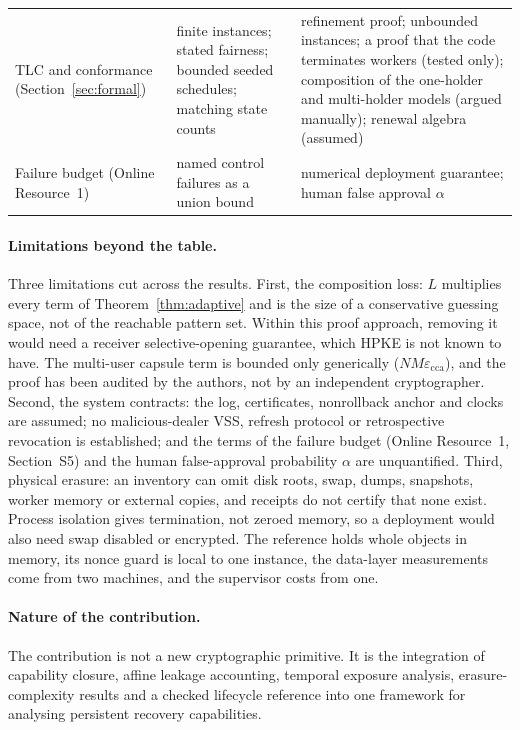 \documentclass[pdflatex,sn-mathphys-num]{sn-jnl}%
\theoremstyle{plain}
\theoremstyle{definition}
\begin{document}
\begin{table}[t]
\begin{tabularx}{\linewidth}{@{}>{\raggedright\arraybackslash}p{.20\linewidth}YY@{}}
TLC and conformance (Section~\ref{sec:formal}) & finite instances; stated fairness; bounded seeded schedules; matching state counts & refinement proof; unbounded instances; a proof that the code terminates workers (tested only); composition of the one-holder and multi-holder models (argued manually); renewal algebra (assumed)\\
Failure budget (Online Resource~1) & named control failures as a union bound & numerical deployment guarantee; human false approval $\alpha$\\\bottomrule
\end{tabularx}
\end{table}

\paragraph{Limitations beyond the table.}
Three limitations cut across the results. First, the composition loss: $L$ multiplies every term of Theorem~\ref{thm:adaptive} and is the size of a conservative guessing space, not of the reachable pattern set. Within this proof approach, removing it would need a receiver selective-opening guarantee, which HPKE is not known to have. The multi-user capsule term is bounded only generically ($NM\varepsilon_{\mathrm{cca}}$), and the proof has been audited by the authors, not by an independent cryptographer. Second, the system contracts: the log, certificates, nonrollback anchor and clocks are assumed; no malicious-dealer VSS, refresh protocol or retrospective revocation is established; and the terms of the failure budget (Online Resource~1, Section~S5) and the human false-approval probability $\alpha$ are unquantified. Third, physical erasure: an inventory can omit disk roots, swap, dumps, snapshots, worker memory or external copies, and receipts do not certify that none exist. Process isolation gives termination, not zeroed memory, so a deployment would also need swap disabled or encrypted. The reference holds whole objects in memory, its nonce guard is local to one instance, the data-layer measurements come from two machines, and the supervisor costs from one.

\paragraph{Nature of the contribution.}
The contribution is not a new cryptographic primitive. It is the integration of capability closure, affine leakage accounting, temporal exposure analysis, erasure-complexity results and a checked lifecycle reference into one framework for analysing persistent recovery capabilities.
\end{document}
